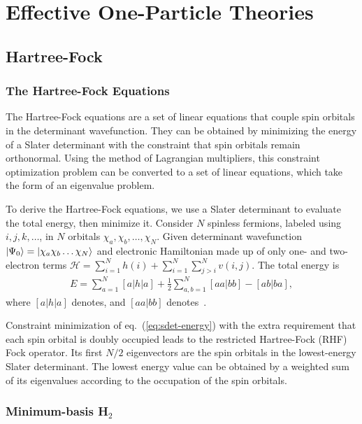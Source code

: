 \section{Effective One-Particle Theories}
\subsection{Hartree-Fock}

\newcommand{\hcore}{H^{\text{core}}_{\mu\nu}}
\newcommand{\ksveff}{V^{\text{eff}}_{\mu\nu}}

\subsubsection{The Hartree-Fock Equations}
The Hartree-Fock equations are a set of linear equations that couple spin orbitals in the determinant wavefunction. They can be obtained by minimizing the energy of a Slater determinant with the constraint that spin orbitals remain orthonormal. Using the method of Lagrangian multipliers, this constraint optimization problem can be converted to a set of linear equations, which take the form of an eigenvalue problem.

To derive the Hartree-Fock equations, we use a Slater determinant to evaluate the total energy, then minimize it. Consider $N$ spinless fermions, labeled using $i,j,k,\dots$, in $N$ orbitals $\chi_a,\chi_b,\dots,\chi_N$. Given determinant wavefunction $\ket{\Psi_0}=\ket{\chi_a\chi_b\dots\chi_N}$ and electronic Hamiltonian made up of only one- and two-electron terms $\mathcal{H}=\sum\limits_{i=1}^N h(i) + \sum\limits_{i=1}^N\sum\limits_{j>i}^N v(i,j)$. The total energy is
\begin{align} \label{eq:sdet-energy}
E= \sum\limits_{a=1}^N [a|h|a] + \frac{1}{2}\sum\limits_{a,b=1}^N [aa|bb] - [ab|ba],
\end{align}
where $[a|h|a]$ denotes, and $[aa|bb]$ denotes~\cite{Szabo1996}.

Constraint minimization of eq.~(\ref{eq:sdet-energy}) with the extra requirement that each spin orbital is doubly occupied leads to the restricted Hartree-Fock (RHF) Fock operator. Its first $N/2$ eigenvectors are the spin orbitals in the lowest-energy Slater determinant. The lowest energy value can be obtained by a weighted sum of its eigenvalues according to the occupation of the spin orbitals.

\subsubsection{Minimum-basis H$_2$}

